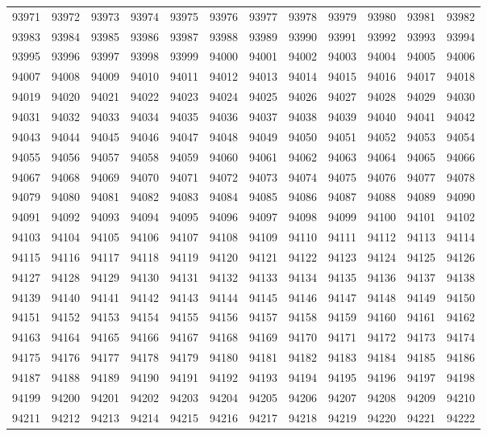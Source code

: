 \begin{center}
\begin{longtable}{llllllllllll}
93971 &93972 &93973 &93974 &93975 &93976 &93977 &93978 &93979 &93980 &93981 &93982 \\
93983 &93984 &93985 &93986 &93987 &93988 &93989 &93990 &93991 &93992 &93993 &93994 \\
93995 &93996 &93997 &93998 &93999 &94000 &94001 &94002 &94003 &94004 &94005 &94006 \\
94007 &94008 &94009 &94010 &94011 &94012 &94013 &94014 &94015 &94016 &94017 &94018 \\
94019 &94020 &94021 &94022 &94023 &94024 &94025 &94026 &94027 &94028 &94029 &94030 \\
94031 &94032 &94033 &94034 &94035 &94036 &94037 &94038 &94039 &94040 &94041 &94042 \\
94043 &94044 &94045 &94046 &94047 &94048 &94049 &94050 &94051 &94052 &94053 &94054 \\
94055 &94056 &94057 &94058 &94059 &94060 &94061 &94062 &94063 &94064 &94065 &94066 \\
94067 &94068 &94069 &94070 &94071 &94072 &94073 &94074 &94075 &94076 &94077 &94078 \\
94079 &94080 &94081 &94082 &94083 &94084 &94085 &94086 &94087 &94088 &94089 &94090 \\
94091 &94092 &94093 &94094 &94095 &94096 &94097 &94098 &94099 &94100 &94101 &94102 \\
94103 &94104 &94105 &94106 &94107 &94108 &94109 &94110 &94111 &94112 &94113 &94114 \\
94115 &94116 &94117 &94118 &94119 &94120 &94121 &94122 &94123 &94124 &94125 &94126 \\
94127 &94128 &94129 &94130 &94131 &94132 &94133 &94134 &94135 &94136 &94137 &94138 \\
94139 &94140 &94141 &94142 &94143 &94144 &94145 &94146 &94147 &94148 &94149 &94150 \\
94151 &94152 &94153 &94154 &94155 &94156 &94157 &94158 &94159 &94160 &94161 &94162 \\
94163 &94164 &94165 &94166 &94167 &94168 &94169 &94170 &94171 &94172 &94173 &94174 \\
94175 &94176 &94177 &94178 &94179 &94180 &94181 &94182 &94183 &94184 &94185 &94186 \\
94187 &94188 &94189 &94190 &94191 &94192 &94193 &94194 &94195 &94196 &94197 &94198 \\
94199 &94200 &94201 &94202 &94203 &94204 &94205 &94206 &94207 &94208 &94209 &94210 \\
94211 &94212 &94213 &94214 &94215 &94216 &94217 &94218 &94219 &94220 &94221 &94222 \\

\end{longtable}
\end{center}
